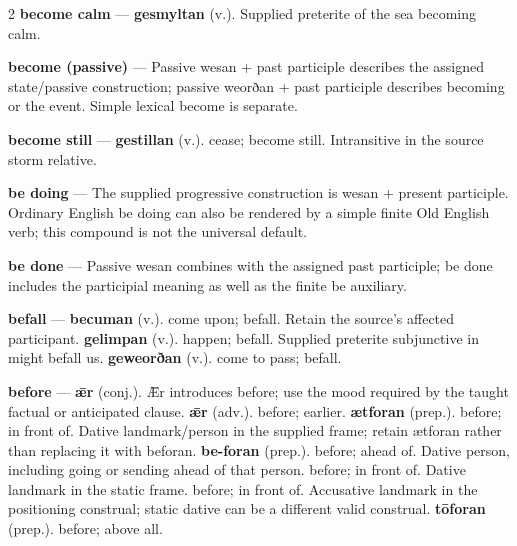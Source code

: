 \begin{multicols}{2}
\textbf{become calm} — \textbf{gesmyltan} (v.). Supplied preterite of the sea becoming calm.\par
\textbf{become (passive)} — Passive wesan + past participle describes the assigned state/passive construction; passive weorðan + past participle describes becoming or the event. Simple lexical become is separate.\par
\textbf{become still} — \textbf{gestillan} (v.). cease; become still. Intransitive in the source storm relative.\par
\textbf{be doing} — The supplied progressive construction is wesan + present participle. Ordinary English be doing can also be rendered by a simple finite Old English verb; this compound is not the universal default.\par
\textbf{be done} — Passive wesan combines with the assigned past participle; be done includes the participial meaning as well as the finite be auxiliary.\par
\textbf{befall} — \textbf{becuman} (v.). come upon; befall. Retain the source's affected participant. \textbf{gelimpan} (v.). happen; befall. Supplied preterite subjunctive in might befall us. \textbf{geweorðan} (v.). come to pass; befall.\par
\textbf{before} — \textbf{ǣr} (conj.). Ǣr introduces before; use the mood required by the taught factual or anticipated clause. \textbf{ǣr} (adv.). before; earlier. \textbf{ætforan} (prep.). before; in front of. Dative landmark/person in the supplied frame; retain ætforan rather than replacing it with beforan. \textbf{be-foran} (prep.). before; ahead of. Dative person, including going or sending ahead of that person. before; in front of. Dative landmark in the static frame. before; in front of. Accusative landmark in the positioning construal; static dative can be a different valid construal. \textbf{tōforan} (prep.). before; above all.\par

\end{multicols}
